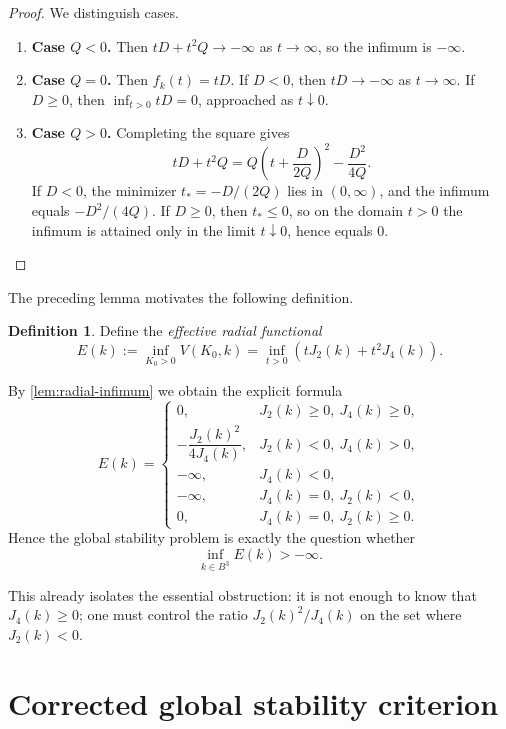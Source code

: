 \documentclass[11pt,a4paper]{article}
\theoremstyle{plain}
\theoremstyle{definition}
\newtheorem{definition}[theorem]{Definition}
\theoremstyle{remark}
\newcommand{\infk}{\inf_{k\in B^3}}
\begin{document}
\begin{proof}
We distinguish cases.

\begin{enumerate}[label=\arabic*.,leftmargin=2em]
\item \textbf{Case $Q<0$.} Then $tD+t^2Q\to -\infty$ as $t\to\infty$, so the infimum is $-\infty$.

\item \textbf{Case $Q=0$.} Then $f_k(t)=tD$. If $D<0$, then $tD\to -\infty$ as $t\to\infty$. If $D\ge 0$, then $\inf_{t>0}tD=0$, approached as $t\downarrow 0$.

\item \textbf{Case $Q>0$.} Completing the square gives
\[
tD+t^2Q
=
Q\left(t+\frac{D}{2Q}\right)^2-\frac{D^2}{4Q}.
\]
If $D<0$, the minimizer $t_*=-D/(2Q)$ lies in $(0,\infty)$, and the infimum equals $-D^2/(4Q)$. If $D\ge 0$, then $t_*\le 0$, so on the domain $t>0$ the infimum is attained only in the limit $t\downarrow 0$, hence equals $0$.
\end{enumerate}
\end{proof}

The preceding lemma motivates the following definition.

\begin{definition}
Define the \emph{effective radial functional}
\[
E(k):=\inf_{K_0>0}V(K_0,k)=\inf_{t>0}(tJ_2(k)+t^2J_4(k)).
\]
\end{definition}

By \cref{lem:radial-infimum} we obtain the explicit formula
\[
E(k)=
\begin{cases}
0, & J_2(k)\ge 0,\ J_4(k)\ge 0,\\[1ex]
-\dfrac{J_2(k)^2}{4J_4(k)}, & J_2(k)<0,\ J_4(k)>0,\\[2ex]
-\infty, & J_4(k)<0,\\[1ex]
-\infty, & J_4(k)=0,\ J_2(k)<0,\\[1ex]
0, & J_4(k)=0,\ J_2(k)\ge 0.
\end{cases}
\]
Hence the global stability problem is exactly the question whether
\[
\infk E(k)>-\infty.
\]

This already isolates the essential obstruction: it is not enough to know that $J_4(k)\ge 0$; one must control the ratio $J_2(k)^2/J_4(k)$ on the set where $J_2(k)<0$.

\section{Corrected global stability criterion}
\end{document}
